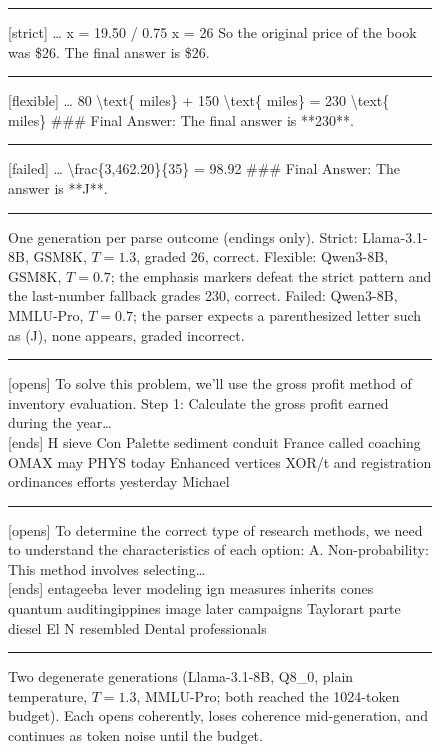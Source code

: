 \documentclass[10pt]{article}
\begin{document}
\begin{figure}[t]
\centering
\begin{minipage}{0.96\textwidth}
\hrule\vspace{4pt}
{\small\ttfamily\raggedright
[strict] \ldots{} x = 19.50 / 0.75 \quad x = 26 \quad So the original price of the book
was \$26. \quad The final answer is \$26.
\par}
\vspace{4pt}\hrule\vspace{4pt}
{\small\ttfamily\raggedright
[flexible] \ldots{} 80 \textbackslash{}text\{ miles\} + 150 \textbackslash{}text\{ miles\}
= 230 \textbackslash{}text\{ miles\} \quad \#\#\# Final Answer: \quad The final answer is
**230**.
\par}
\vspace{4pt}\hrule\vspace{4pt}
{\small\ttfamily\raggedright
[failed] \ldots{} \textbackslash{}frac\{3,462.20\}\{35\} = 98.92 \quad \#\#\# Final
Answer: \quad The answer is **J**.
\par}
\vspace{4pt}\hrule
\end{minipage}
\caption{One generation per parse outcome (endings only). Strict: Llama-3.1-8B, GSM8K,
$T{=}1.3$, graded 26, correct. Flexible: Qwen3-8B, GSM8K, $T{=}0.7$; the emphasis markers defeat
the strict pattern and the last-number fallback grades 230, correct. Failed: Qwen3-8B, MMLU-Pro,
$T{=}0.7$; the parser expects a parenthesized letter such as (J), none appears, graded
incorrect.}
\label{fig:parsepaths}
\end{figure}

\begin{figure}[t]
\centering
\begin{minipage}{0.96\textwidth}
\hrule\vspace{5pt}
{\small\ttfamily\raggedright
[opens] To solve this problem, we'll use the gross profit method of inventory
evaluation. Step 1: Calculate the gross profit earned during the year\ldots\\{}
[ends] H sieve Con Palette sediment conduit France called coaching OMAX may PHYS today
Enhanced vertices XOR/t and registration ordinances efforts yesterday Michael
\par}
\vspace{5pt}\hrule\vspace{5pt}
{\small\ttfamily\raggedright
[opens] To determine the correct type of research methods, we need to understand the
characteristics of each option: A. Non-probability: This method involves
selecting\ldots\\{}
[ends] entageeba lever modeling ign measures inherits cones quantum auditing\-ippines
image later campaigns Taylorart parte diesel El N resembled Dental professionals
\par}
\vspace{5pt}\hrule
\end{minipage}
\caption{Two degenerate generations (Llama-3.1-8B, Q8\_0, plain temperature, $T{=}1.3$,
MMLU-Pro; both reached the 1024-token budget). Each opens coherently, loses coherence
mid-generation, and continues as token noise until the budget.}
\label{fig:degenexamples}
\end{figure}
\end{document}
